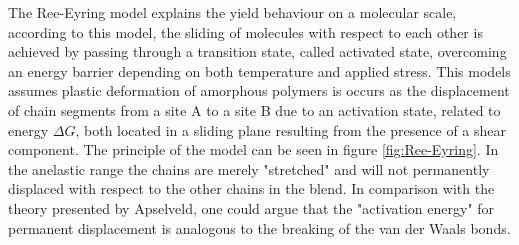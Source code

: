 The Ree-Eyring model explains the yield behaviour on a molecular scale, according to this model, the sliding of molecules with respect to each other is achieved by passing through a transition state, called activated state, overcoming an energy barrier depending on both temperature and applied stress. This models assumes plastic deformation of amorphous polymers is occurs as the displacement of chain segments from a site A to a site B due to an activation state, related to energy $\Delta G$, both located in a sliding plane resulting from the presence of a shear component. The principle of the model can be seen in figure \ref{fig:Ree-Eyring}. In the anelastic range the chains are merely "stretched" and will not permanently displaced with respect to the other chains in the blend. In comparison with the theory presented by Apselveld, one could argue that the "activation energy" for permanent displacement is analogous to the breaking of the van der Waals bonds.

